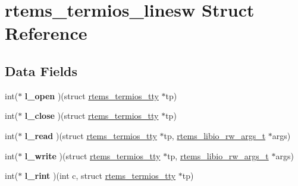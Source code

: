 \hypertarget{structrtems__termios__linesw}{}\section{rtems\+\_\+termios\+\_\+linesw Struct Reference}
\label{structrtems__termios__linesw}
\subsection*{Data Fields}
\begin{DoxyCompactItemize}
\item 
\mbox{\label{structrtems__termios__linesw_a2f56548c60c05897e6dcaf8d901f4df4}} 
int($\ast$ {\bfseries l\+\_\+open} )(struct \mbox{\hyperlink{structrtems__termios__tty}{rtems\+\_\+termios\+\_\+tty}} $\ast$tp)
\item 
\mbox{\label{structrtems__termios__linesw_a7fa0f36f802d2146ad0acadd7e11bd39}} 
int($\ast$ {\bfseries l\+\_\+close} )(struct \mbox{\hyperlink{structrtems__termios__tty}{rtems\+\_\+termios\+\_\+tty}} $\ast$tp)
\item 
\mbox{\label{structrtems__termios__linesw_a3053b07eebc77bdf3bb1c5a33b33fcea}} 
int($\ast$ {\bfseries l\+\_\+read} )(struct \mbox{\hyperlink{structrtems__termios__tty}{rtems\+\_\+termios\+\_\+tty}} $\ast$tp, \mbox{\hyperlink{structrtems__libio__rw__args__t}{rtems\+\_\+libio\+\_\+rw\+\_\+args\+\_\+t}} $\ast$args)
\item 
\mbox{\label{structrtems__termios__linesw_a811d9027aac99d22e36c02f0bc44234a}} 
int($\ast$ {\bfseries l\+\_\+write} )(struct \mbox{\hyperlink{structrtems__termios__tty}{rtems\+\_\+termios\+\_\+tty}} $\ast$tp, \mbox{\hyperlink{structrtems__libio__rw__args__t}{rtems\+\_\+libio\+\_\+rw\+\_\+args\+\_\+t}} $\ast$args)
\item 
\mbox{\label{structrtems__termios__linesw_a01d55ff8084ec037b0a4782c859adb34}} 
int($\ast$ {\bfseries l\+\_\+rint} )(int c, struct \mbox{\hyperlink{structrtems__termios__tty}{rtems\+\_\+termios\+\_\+tty}} $\ast$tp)
\item 
\mbox{\label{structrtems__termios__linesw_a40facfd300d8c48f90302bccaafb9033}} 

\end{DoxyCompactItemize}
